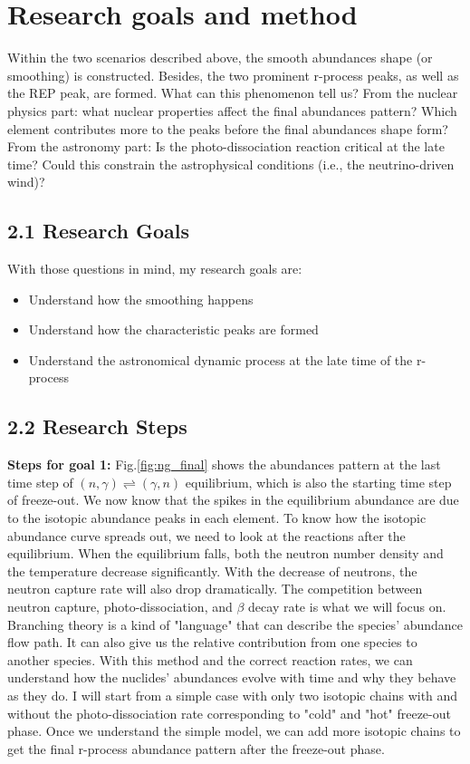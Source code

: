 \documentclass[aps,prl,preprint,groupedaddress]{revtex4}
\begin{document}
\section{Research goals and method}
Within the two scenarios described above, the smooth abundances shape (or smoothing) is constructed. Besides, the two prominent r-process peaks, as well as the REP peak, are formed. What can this phenomenon tell us? From the nuclear physics part: what nuclear properties affect the final abundances pattern? Which element contributes more to the peaks before the final abundances shape form? From the astronomy part: Is the photo-dissociation reaction critical at the late time? Could this constrain the astrophysical conditions (i.e., the neutrino-driven wind)?  

\subsection{2.1 Research Goals}
With those questions in mind, my research goals are:
\begin{itemize}
    \item Understand how the smoothing happens
    \item Understand how the characteristic peaks are formed
    \item Understand the astronomical dynamic process at the late time of the r-process
\end{itemize}

\subsection{2.2 Research Steps}
\textbf{Steps for goal 1:} Fig.\ref{fig:ng_final} shows the abundances pattern at the last time step of $(n, \gamma)\rightleftharpoons (\gamma, n)$ equilibrium, which is also the starting time step of freeze-out. We now know that the spikes in the equilibrium abundance are due to the isotopic abundance peaks in each element. To know how the isotopic abundance curve spreads out, we need to look at the reactions after the equilibrium. When the equilibrium falls, both the neutron number density and the temperature decrease significantly. With the decrease of neutrons, the neutron capture rate will also drop dramatically. The competition between neutron capture, photo-dissociation, and $\beta$ decay rate is what we will focus on.\\

Branching theory is a kind of "language" that can describe the species' abundance flow path. It can also give us the relative contribution from one species to another species. With this method and the correct reaction rates, we can understand how the nuclides' abundances evolve with time and why they behave as they do. I will start from a simple case with only two isotopic chains with and without the photo-dissociation rate corresponding to "cold" and "hot" freeze-out phase. Once we understand the simple model, we can add more isotopic chains to get the final r-process abundance pattern after the freeze-out phase.\\
\end{document}
